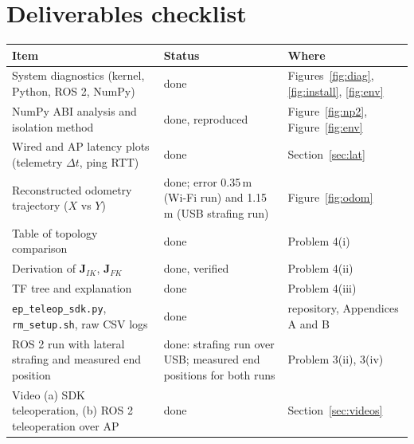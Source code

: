 \documentclass[11pt,a4paper]{article}
\begin{document}
\section{Deliverables checklist}
\begin{center}\small
\begin{tabular}{@{}p{7.4cm}p{3.1cm}p{5.0cm}@{}}
\toprule
\textbf{Item} & \textbf{Status} & \textbf{Where}\\
\midrule
System diagnostics (kernel, Python, ROS 2, NumPy) & done & Figures~\ref{fig:diag}, \ref{fig:install}, \ref{fig:env}\\
NumPy ABI analysis and isolation method & done, reproduced & Figure~\ref{fig:np2}, Figure~\ref{fig:env}\\
Wired and AP latency plots (telemetry $\Delta t$, ping RTT) & done & Section~\ref{sec:lat}\\
Reconstructed odometry trajectory ($X$ vs $Y$) & done; error 0.35\,m (Wi-Fi run) and 1.15\,m (USB strafing run) & Figure~\ref{fig:odom}\\
Table of topology comparison & done & Problem 4(i)\\
Derivation of $\mathbf J_{IK}$, $\mathbf J_{FK}$ & done, verified & Problem 4(ii)\\
TF tree and explanation & done & Problem 4(iii)\\
\texttt{ep\_teleop\_sdk.py}, \texttt{rm\_setup.sh}, raw CSV logs & done & repository, Appendices A and B\\
ROS 2 run with lateral strafing and measured end position & done: strafing run over USB; measured end positions for both runs & Problem 3(ii), 3(iv)\\
Video (a) SDK teleoperation, (b) ROS 2 teleoperation over AP & done & Section~\ref{sec:videos}\\
\bottomrule
\end{tabular}
\end{center}
\end{document}
